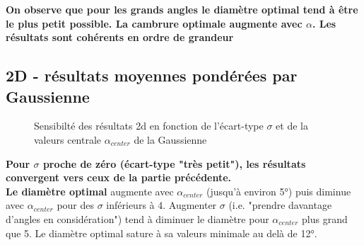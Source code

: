 \textbf{On observe que pour les grands angles le diamètre optimal tend à être le plus petit possible. La cambrure optimale augmente avec $\alpha$. Les résultats sont cohérents en ordre de grandeur}

\subsection{2D - résultats moyennes pondérées par Gaussienne}
\label{sec:Ch3.2}

\begin{figure}[h!]
    \centering
    \hfill 
    \caption{Sensibilté des résultats 2d en fonction de l'écart-type $\sigma$ et de la valeurs centrale $\alpha_{center}$ de la Gaussienne}
    \label{fig:gaussian sensibility 2d}
\end{figure}

\textbf{Pour $\sigma$ proche de zéro (écart-type "très petit"), les résultats convergent vers ceux de la partie précédente. }\\

\textbf{Le diamètre optimal} augmente avec $\alpha_{center}$ (jusqu'à environ 5°) puis diminue avec $\alpha_{center}$ pour des $\sigma$ inférieurs à 4. Augmenter $\sigma$ (i.e. "prendre davantage d'angles en considération") tend à diminuer le diamètre pour $\alpha_{center}$ plus grand que 5. Le diamètre optimal sature à sa valeurs minimale au delà de 12°. \\

